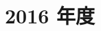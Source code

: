 \documentclass[../../hsm_tok_a.tex]{subfiles}
\begin{document}
    \section{2016 年度}

    

    \clearpage

    
\end{document}
